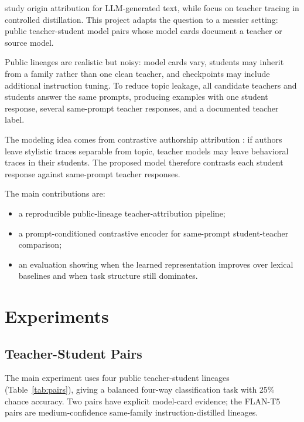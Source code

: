 \documentclass[11pt]{article}
\begin{document}
\citet{li-etal-2024-where} study origin attribution for LLM-generated text, while \citet{wadhwa-etal-2025-taught} focus on teacher tracing in controlled distillation.
This project adapts the question to a messier setting: public teacher-student model pairs whose model cards document a teacher or source model.

Public lineages are realistic but noisy: model cards vary, students may inherit from a family rather than one clean teacher, and checkpoints may include additional instruction tuning.
To reduce topic leakage, all candidate teachers and students answer the same prompts, producing examples with one student response, several same-prompt teacher responses, and a documented teacher label.

The modeling idea comes from contrastive authorship attribution \citep{ai-etal-2022-whodunit,hu2024contrastive,huertas2024isolating}: if authors leave stylistic traces separable from topic, teacher models may leave behavioral traces in their students.
The proposed model therefore contrasts each student response against same-prompt teacher responses.

The main contributions are:
\begin{itemize}
    \item a reproducible public-lineage teacher-attribution pipeline;
    \item a prompt-conditioned contrastive encoder for same-prompt student-teacher comparison;
    \item an evaluation showing when the learned representation improves over lexical baselines and when task structure still dominates.
\end{itemize}

\section{Experiments}

\subsection{Teacher-Student Pairs}

The main experiment uses four public teacher-student lineages (Table~\ref{tab:pairs}), giving a balanced four-way classification task with 25\% chance accuracy.
Two pairs have explicit model-card evidence; the FLAN-T5 pairs are medium-confidence same-family instruction-distilled lineages.
\end{document}
